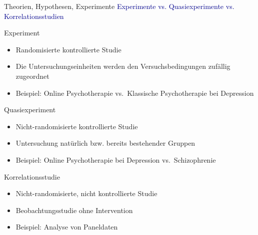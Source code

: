 \documentclass[
  8pt,
  ignorenonframetext,
]{beamer}
\providecommand{\tightlist}{%
  \setlength{\itemsep}{0pt}\setlength{\parskip}{0pt}}
\begin{document}
\begin{frame}{Theorien, Hypothesen, Experimente}
\protect\hypertarget{theorien-hypothesen-experimente-7}{}
\textcolor{darkblue}{Experimente vs. Quasiexperimente vs. Korrelationsstudien}

Experiment

\begin{itemize}
\tightlist
\item
  Randomisierte kontrollierte Studie
\item
  Die Untersuchungseinheiten werden den Versuchsbedingungen zufällig
  zugeordnet
\item
  Beispiel: Online Psychotherapie vs.~Klassische Psychotherapie bei
  Depression
\end{itemize}

\normalsize

Quasiexperiment

\begin{itemize}
\tightlist
\item
  Nicht-randomisierte kontrollierte Studie
\item
  Untersuchung natürlich bzw. bereits bestehender Gruppen
\item
  Beispiel: Online Psychotherapie bei Depression vs.~Schizophrenie
\end{itemize}

\normalsize

Korrelationsstudie

\begin{itemize}
\tightlist
\item
  Nicht-randomisierte, nicht kontrollierte Studie
\item
  Beobachtungsstudie ohne Intervention
\item
  Beispiel: Analyse von Paneldaten
\end{itemize}
\end{frame}
\end{document}
